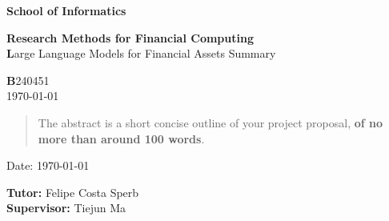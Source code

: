 \documentclass[a4paper,12pt]{article}
\newcommand{\examnumber}{B240451}
\newcommand{\field}{Large Language Models for Financial Assets Summary}
\newcommand{\tutor}{Felipe Costa Sperb}
\newcommand{\supervisor}{Tiejun Ma}
\begin{document}
\begin{minipage}[b]{110mm}
        {\Huge\textbf{School of Informatics}
        \vspace*{17mm}}
\end{minipage}
\hfill
\begin{minipage}[t]{40mm}               
\end{minipage}
\par\noindent
\vspace*{2cm}
\begin{center}
        \Large\textbf{Research Methods for Financial Computing}\\
        \Large\textbf \field
\end{center}
\vspace*{1.5cm}
\begin{center}
        \textbf \examnumber\\
        \monthyeardate\today
\end{center}
\vspace*{5mm}

%
%                       
\begin{abstract}
        The abstract is a short concise outline of your 
        project proposal, \textbf{of no more than around 100 words}.
\end{abstract}

\vspace*{1cm}

\vspace*{3cm}
Date: \today

\vfill
{\textbf {Tutor:}} \tutor\\
{\textbf {Supervisor:}} \supervisor
\newpage

\setcounter{page}{1}                            %
\footruleheight{1pt}
\headruleheight{1pt}
\rhead{- \thepage}
\cfoot{}
%
\end{document}

